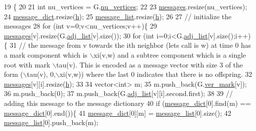 \begin{DoxyCode}
19 \{
20 
21   \textcolor{keywordtype}{int} nu\_vertices = G.\hyperlink{classmarked__graph_acf79c6aeb8f32614cb14a5baaa6c9f9b}{nu\_vertices};
22 
23   \hyperlink{classgraph__message_aac77e098f0acf9650116a8e51fe3b4b7}{messages}.resize(nu\_vertices);
24   \hyperlink{classgraph__message_ad0a6d35ac8550fb7ff03ce90fce7d5a5}{message\_dict}.resize(\hyperlink{classgraph__message_a934d63ed7275c211e13c6fb68824ed46}{h});
25   \hyperlink{classgraph__message_aa17fdb629b423343edfafa97252763ef}{message\_list}.resize(\hyperlink{classgraph__message_a934d63ed7275c211e13c6fb68824ed46}{h});
26 
27   \textcolor{comment}{// initialize the messages}
28   \textcolor{keywordflow}{for} (\textcolor{keywordtype}{int} v=0;v<nu\_vertices;v++)\{
29     \hyperlink{classgraph__message_aac77e098f0acf9650116a8e51fe3b4b7}{messages}[v].resize(G.\hyperlink{classmarked__graph_a1a0bf7ca413a278763f7c878b3b6fd6f}{adj\_list}[v].size());
30     \textcolor{keywordflow}{for} (\textcolor{keywordtype}{int} i=0;i<G.\hyperlink{classmarked__graph_a1a0bf7ca413a278763f7c878b3b6fd6f}{adj\_list}[v].size();i++)\{
31       \textcolor{comment}{// the message from v towards the ith neighbor (lets call is w) at time 0 has a mark component which
       is \(\backslash\)xi(v,w) and a subtree component which is a single root with mark \(\backslash\)tau(v). This is encoded as a message
       vector with size 3 of the form (\(\backslash\)tau(v), 0,\(\backslash\)xi(v,w)) where the last 0 indicates that there is no offspring.}
32       \hyperlink{classgraph__message_aac77e098f0acf9650116a8e51fe3b4b7}{messages}[v][i].resize(\hyperlink{classgraph__message_a934d63ed7275c211e13c6fb68824ed46}{h});
33 
34       vector<int> m;
35       m.push\_back(G.\hyperlink{classmarked__graph_ac83e9377dd4d8bb95be1ac949b127296}{ver\_mark}[v]);
36       m.push\_back(0);
37       m.push\_back(G.\hyperlink{classmarked__graph_a1a0bf7ca413a278763f7c878b3b6fd6f}{adj\_list}[v][i].second.first);
38 
39       \textcolor{comment}{// adding this message to the message dictionary}
40       \textcolor{keywordflow}{if} (\hyperlink{classgraph__message_ad0a6d35ac8550fb7ff03ce90fce7d5a5}{message\_dict}[0].find(m) == \hyperlink{classgraph__message_ad0a6d35ac8550fb7ff03ce90fce7d5a5}{message\_dict}[0].end())\{
41         \hyperlink{classgraph__message_ad0a6d35ac8550fb7ff03ce90fce7d5a5}{message\_dict}[0][m] = \hyperlink{classgraph__message_aa17fdb629b423343edfafa97252763ef}{message\_list}[0].size();
42         \hyperlink{classgraph__message_aa17fdb629b423343edfafa97252763ef}{message\_list}[0].push\_back(m);

\end{DoxyCode}
